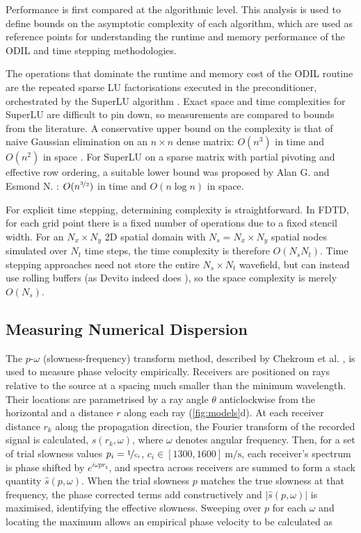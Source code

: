 \documentclass[final-report]{report-template}
\begin{document}
Performance is first compared at the algorithmic level. This analysis is used to define bounds on the asymptotic complexity of each algorithm, which are used as reference points for understanding the runtime and memory performance of the ODIL and time stepping methodologies. 

The operations that dominate the runtime and memory cost of the ODIL routine are the repeated sparse LU factorisations executed in the preconditioner, orchestrated by the SuperLU algorithm \cite{Demmel:CSD-97-944}. Exact space and time complexities for SuperLU are difficult to pin down, so measurements are compared to bounds from the literature. A conservative upper bound on the complexity is that of naive Gaussian elimination on an $n\times n$ dense matrix: $O(n^3)$ in time and $O(n^2)$ in space \cite{liOverviewSuperLUAlgorithms2005}. For SuperLU on a sparse matrix with partial pivoting and effective row ordering, a suitable lower bound was proposed by Alan G. and Esmond N. \cite{doi:10.1137/0909057}: $O(n^{\nicefrac{3}{2}})$ in time and $O(n\log n)$ in space.   

For explicit time stepping, determining complexity is straightforward. In FDTD, for each grid point there is a fixed number of operations due to a fixed stencil width. For an $N_x \times N_y$ 2D spatial domain with $N_s = N_x \times N_y$ spatial nodes simulated over $N_t$ time steps, the time complexity is therefore $O(N_sN_t)$. Time stepping approaches need not store the entire $N_s \times N_t$ wavefield, but can instead use rolling buffers (as Devito indeed does \cite{louboutinDevitoV310Embedded2019}), so the space complexity is merely $O(N_s)$.

\subsection{Measuring Numerical Dispersion}
\label{subsect:wave_specifics}

The $p$-$\omega$ (slowness-frequency) transform method, described by Chekroun et al. \cite{chekrounTimedomainNumericalSimulations2012}, is used to measure phase velocity empirically. Receivers are positioned on rays relative to the source at a spacing much smaller than the minimum wavelength. Their locations are parametrised by a ray angle $\theta$ anticlockwise from the horizontal and a distance $r$ along each ray (\ref{fig:models}d). At each receiver distance $r_k$ along the propagation direction, the Fourier transform of the recorded signal is calculated, $s(r_k, \omega)$, where $\omega$ denotes angular frequency. Then, for a set of trial slowness values $p_i = \nicefrac{1}{c_i}$, $c_i \in [1300, 1600]\ \si{\metre\per\second}$, each receiver's spectrum is phase shifted by $e^{i\omega p r_k}$, and spectra across receivers are summed to form a stack quantity $\hat{s}(p, \omega)$. When the trial slowness $p$ matches the true slowness at that frequency, the phase corrected terms add constructively and $|\hat{s}(p, \omega)|$ is maximised, identifying the effective slowness. Sweeping over $p$ for each $\omega$ and locating the maximum allows an empirical phase velocity to be calculated as
\end{document}
